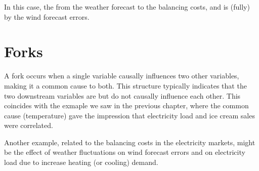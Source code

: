 \documentclass[letterpaper,10pt,english]{jupyterBook}
\begin{document}
\sphinxAtStartPar
In this case, the  from the weather forecast to the balancing costs, and is (fully)  by the wind forecast errors.


\section{Forks}
\label{\detokenize{notebooks/basic_dag_structures:forks}}
\sphinxAtStartPar
A fork occurs when a single variable causally influences two other variables, making it a common cause to both. This structure typically indicates that the two downstream variables are  but do not causally influence each other. This coincides with the exmaple we saw in the previous chapter, where the common cause (temperature) gave the impression that electricity load and ice cream sales were correlated.

\sphinxAtStartPar
Another example, related to the balancing costs in the electricity markets, might be the effect of weather fluctuations on wind forecast errors and on electricity load due to increase heating (or cooling) demand.
\end{document}
